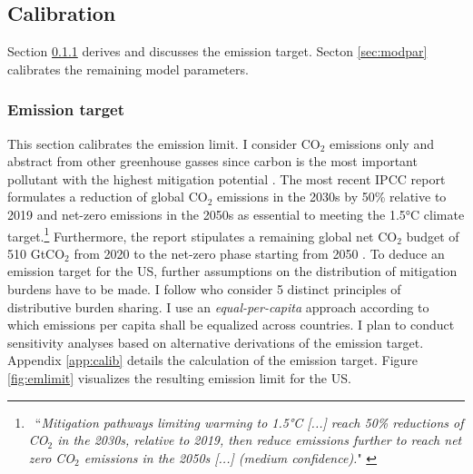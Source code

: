 \subsection{Calibration}\label{sec:calib2}

Section \ref{sec:ems} derives and discusses the emission target. 
Secton \ref{sec:modpar} calibrates the remaining model parameters.

\subsubsection{Emission target}\label{sec:ems}
This section calibrates the emission limit. I consider CO$_2$ emissions only and abstract from other greenhouse gasses since carbon is the most important pollutant with the highest mitigation potential \citep[p.29]{IPCC2022}.
The most recent IPCC report \citep{IPCC2022} formulates a reduction of global CO$_2$ emissions in the 2030s by 50\% relative to 2019 and net-zero emissions in the 2050s  as essential to meeting the 1.5°C climate target.\footnote{\ ``\textit{Mitigation pathways limiting warming to 1.5°C [...] reach 50\% reductions of CO$_2$ in the 2030s, relative to 2019, then reduce emissions further to reach net zero CO$_2$ emissions in the 2050s [...] (\textnormal{medium confidence}).}" \citep[p.5, Chapter 3]{IPCC2022} }  Furthermore, the report stipulates a remaining global net CO$_2$ budget of 510 GtCO$_2$ %
from 2020 to the net-zero phase starting from 2050 \citep[p.5, Chapter 3]{IPCC2022}. 
To deduce an emission target for the US, further assumptions on the distribution of mitigation burdens have to be made. I follow \cite{RobiouDuPont2017EquitableGoals} who consider 5 distinct principles of distributive burden sharing. I use an \textit{equal-per-capita} approach according to which emissions per capita shall be equalized across countries. 
I plan to conduct sensitivity analyses based on alternative derivations of the emission target. Appendix \ref{app:calib} details the calculation of the emission target. 
Figure \ref{fig:emlimit}  visualizes the resulting emission limit for the US.

